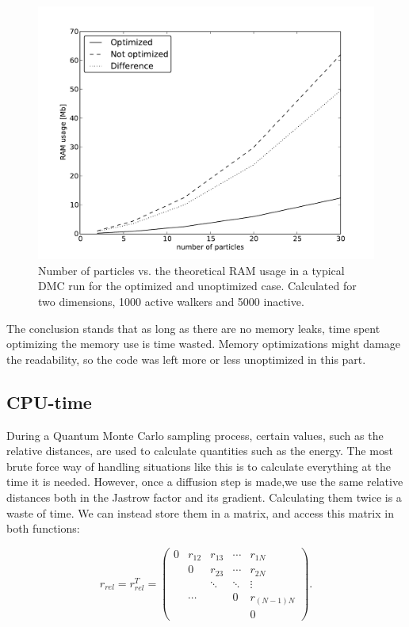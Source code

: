 \begin{figure}
\label{FIG:RAMusageDMC}
 \begin{center}
  \includegraphics[scale=0.75]{../Graphics/RAMusagePrWalker.pdf}
  \caption{Number of particles vs. the theoretical RAM usage in a typical DMC run for the optimized and unoptimized case. Calculated for two dimensions, 1000 active walkers and 5000 inactive.}
 \end{center}
\end{figure}

The conclusion stands that as long as there are no memory leaks, time spent optimizing the memory use is time wasted. Memory optimizations might damage the readability, so the code was left more or less unoptimized in this part.

\subsection{CPU-time}

During a Quantum Monte Carlo sampling process, certain values, such as the relative distances, are used to calculate quantities such as the energy. The most brute force way of handling situations like this is to calculate everything at the time it is needed. However, once a diffusion step is made,we use the same relative distances both in the Jastrow factor and its gradient. Calculating them twice is a waste of time. We can instead store them in a matrix, and access this matrix in both functions:

\[
r_{rel} = r_{rel}^T = \left( \begin{array}{ccccc}
0 & r_{12} & r_{13} & \cdots & r_{1N} \\
 & 0 & r_{23} & \cdots & r_{2N}  \\
 &  & \ddots & \ddots & \vdots \\
 & \cdots &  & 0 & r_{(N-1)N} \\
 &  &  &  & 0\end{array} \right).
\]

